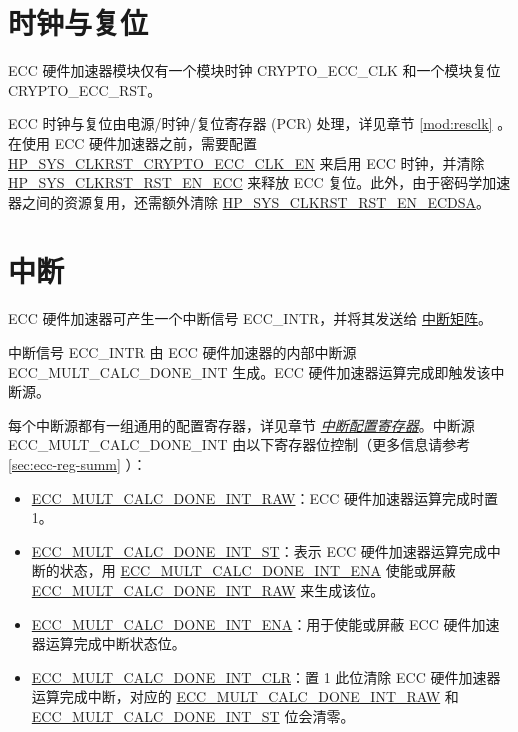 \documentclass[main\_\_CN.tex]{subfiles}
\begin{document}
\section{时钟与复位}
\label{sec:ecc-clkrst}

\chipname{} ECC 硬件加速器模块仅有一个模块时钟 CRYPTO\_ECC\_CLK 和一个模块复位 CRYPTO\_ECC\_RST。

ECC 时钟与复位由电源/时钟/复位寄存器 (PCR) 处理，详见章节 \ref{mod:resclk} \textit{}。在使用 ECC 硬件加速器之前，需要配置 \hyperref[fielddesc:HPSYSCLKRSTCRYPTOECCCLKEN]{HP\_SYS\_CLKRST\_CRYPTO\_ECC\_CLK\_EN} 来启用 ECC 时钟，并清除 \hyperref[fielddesc:HPSYSCLKRSTRSTENECC]{HP\_SYS\_CLKRST\_RST\_EN\_ECC} 来释放 ECC 复位。此外，由于密码学加速器之间的资源复用，还需额外清除 \hyperref[fielddesc:HPSYSCLKRSTRSTENECDSA]{HP\_SYS\_CLKRST\_RST\_EN\_ECDSA}。



\section{中断}
\label{sec:ecc-interrupt}

\chipname{} ECC 硬件加速器可产生一个中断信号 ECC\_INTR，并将其发送给 \hyperref[mod:intmtrx]{中断矩阵}。

中断信号 ECC\_INTR 由 ECC 硬件加速器的内部中断源 \label{int:ECCMULTCALCDONEINT}{ECC\_MULT\_CALC\_DONE\_INT} 生成。ECC 硬件加速器运算完成即触发该中断源。

每个中断源都有一组通用的配置寄存器，详见章节 \hyperref[interrupt-config-registers]{\textit{中断配置寄存器}}。中断源 ECC\_MULT\_CALC\_DONE\_INT 由以下寄存器位控制（更多信息请参考 \ref{sec:ecc-reg-summ} \textit{}）：

\begin{itemize}
    \item \hyperref[fielddesc:ECCMULTCALCDONEINTRAW]{ECC\_MULT\_CALC\_DONE\_INT\_RAW}：ECC 硬件加速器运算完成时置 1。
    \item \hyperref[fielddesc:ECCMULTCALCDONEINTST]{ECC\_MULT\_CALC\_DONE\_INT\_ST}：表示 ECC 硬件加速器运算完成中断的状态，用 \hyperref[fielddesc:ECCMULTCALCDONEINTENA]{ECC\_MULT\_CALC\_DONE\_INT\_ENA} 使能或屏蔽 \hyperref[fielddesc:ECCMULTCALCDONEINTRAW]{ECC\_MULT\_CALC\_DONE\_INT\_RAW} 来生成该位。
    \item \hyperref[fielddesc:ECCMULTCALCDONEINTENA]{ECC\_MULT\_CALC\_DONE\_INT\_ENA}：用于使能或屏蔽 ECC 硬件加速器运算完成中断状态位。
    \item \hyperref[fielddesc:ECCMULTCALCDONEINTCLR]{ECC\_MULT\_CALC\_DONE\_INT\_CLR}：置 1 此位清除 ECC 硬件加速器运算完成中断，对应的 \hyperref[fielddesc:ECCMULTCALCDONEINTRAW]{ECC\_MULT\_CALC\_DONE\_INT\_RAW} 和 \hyperref[fielddesc:ECCMULTCALCDONEINTST]{ECC\_MULT\_CALC\_DONE\_INT\_ST} 位会清零。
\end{itemize}
\end{document}
